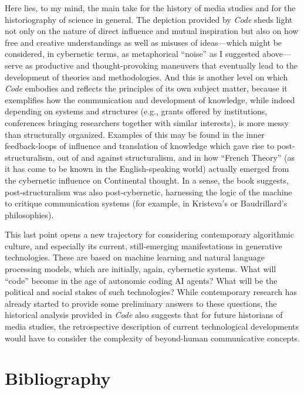 \documentclass{tufte-handout}
\begin{document}
Here lies, to my mind, the main take for the history of media studies
and for the historiography of science in general. The depiction provided
by \emph{Code} sheds light not only on the nature of direct influence
and mutual inspiration but also on how free and creative understandings
as well as misuses of ideas---which might be considered, in cybernetic
terms, as metaphorical ``noise'' as I suggested above---serve as
productive and thought-provoking maneuvers that eventually lead to the
development of theories and methodologies. And this is another level on
which \emph{Code} embodies and reflects the principles of its own
subject matter, because it exemplifies how the communication and
development of knowledge, while indeed depending on systems and
structures (e.g., grants offered by institutions, conferences bringing
researchers together with similar interests), is more messy than
structurally organized. Examples of this may be found in the inner
feedback-loops of influence and translation of knowledge which gave rise
to post-structuralism, out of and against structuralism, and in how
``French Theory'' (as it has come to be known in the English-speaking
world) actually emerged from the cybernetic influence on Continental
thought. In a sense, the book suggests, post-structuralism was also
post-cybernetic, harnessing the logic of the machine to critique
communication systems (for example, in Kristeva's or Baudrillard's
philosophies).

This last point opens a new trajectory for considering contemporary
algorithmic culture, and especially its current, still-emerging
manifestations in generative technologies. These are based on machine
learning and natural language processing models, which are initially,
again, cybernetic systems. What will ``code'' become in the age of
autonomic coding AI agents? What will be the political and social stakes
of such technologies? While contemporary research has already started to
provide some preliminary answers to these questions, the historical
analysis provided in \emph{Code} also suggests that for future
historians of media studies, the retrospective description of current
technological developments would have to consider the complexity of
beyond-human communicative concepts.




\section{Bibliography}\label{bibliography}
\end{document}
